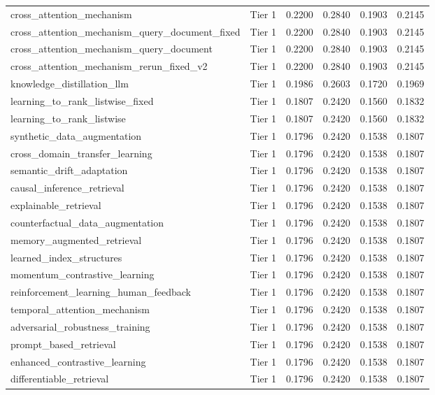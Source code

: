 \documentclass[11pt]{article}
\begin{document}
\begin{longtable}{lccccc}
cross\_attention\_mechanism & Tier 1 & 0.2200 & 0.2840 & 0.1903 & 0.2145 \\
cross\_attention\_mechanism\_query\_document\_fixed & Tier 1 & 0.2200 & 0.2840 & 0.1903 & 0.2145 \\
cross\_attention\_mechanism\_query\_document & Tier 1 & 0.2200 & 0.2840 & 0.1903 & 0.2145 \\
cross\_attention\_mechanism\_rerun\_fixed\_v2 & Tier 1 & 0.2200 & 0.2840 & 0.1903 & 0.2145 \\
knowledge\_distillation\_llm & Tier 1 & 0.1986 & 0.2603 & 0.1720 & 0.1969 \\
learning\_to\_rank\_listwise\_fixed & Tier 1 & 0.1807 & 0.2420 & 0.1560 & 0.1832 \\
learning\_to\_rank\_listwise & Tier 1 & 0.1807 & 0.2420 & 0.1560 & 0.1832 \\
synthetic\_data\_augmentation & Tier 1 & 0.1796 & 0.2420 & 0.1538 & 0.1807 \\
cross\_domain\_transfer\_learning & Tier 1 & 0.1796 & 0.2420 & 0.1538 & 0.1807 \\
semantic\_drift\_adaptation & Tier 1 & 0.1796 & 0.2420 & 0.1538 & 0.1807 \\
causal\_inference\_retrieval & Tier 1 & 0.1796 & 0.2420 & 0.1538 & 0.1807 \\
explainable\_retrieval & Tier 1 & 0.1796 & 0.2420 & 0.1538 & 0.1807 \\
counterfactual\_data\_augmentation & Tier 1 & 0.1796 & 0.2420 & 0.1538 & 0.1807 \\
memory\_augmented\_retrieval & Tier 1 & 0.1796 & 0.2420 & 0.1538 & 0.1807 \\
learned\_index\_structures & Tier 1 & 0.1796 & 0.2420 & 0.1538 & 0.1807 \\
momentum\_contrastive\_learning & Tier 1 & 0.1796 & 0.2420 & 0.1538 & 0.1807 \\
reinforcement\_learning\_human\_feedback & Tier 1 & 0.1796 & 0.2420 & 0.1538 & 0.1807 \\
temporal\_attention\_mechanism & Tier 1 & 0.1796 & 0.2420 & 0.1538 & 0.1807 \\
adversarial\_robustness\_training & Tier 1 & 0.1796 & 0.2420 & 0.1538 & 0.1807 \\
prompt\_based\_retrieval & Tier 1 & 0.1796 & 0.2420 & 0.1538 & 0.1807 \\
enhanced\_contrastive\_learning & Tier 1 & 0.1796 & 0.2420 & 0.1538 & 0.1807 \\
differentiable\_retrieval & Tier 1 & 0.1796 & 0.2420 & 0.1538 & 0.1807 \\

\end{longtable}
\end{document}
